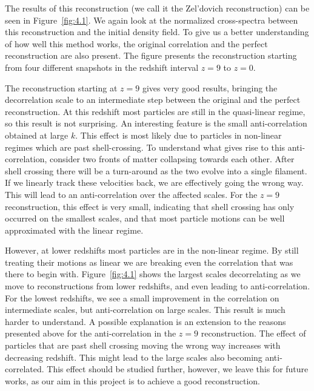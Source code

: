 The results of this reconstruction (we call it the Zel'dovich reconstruction) can be seen in Figure~\ref{fig:4.1}. We again look at the normalized cross-spectra between this reconstruction and the initial density field. To give us a better understanding of how well this method works, the original correlation and the perfect reconstruction are also present. The figure presents the reconstruction starting from four different snapshots in the redshift interval $z=9$ to $z=0$.

The reconstruction starting at $z=9$ gives very good results, bringing the decorrelation scale to an intermediate step between the original and the perfect reconstruction. At this redshift most particles are still in the quasi-linear regime, so this result is not surprising. An interesting feature is the small anti-correlation obtained at large $k$. This effect is most likely due to particles in non-linear regimes which are past shell-crossing. To understand what gives rise to this anti-correlation, consider two fronts of matter collapsing towards each other. After shell crossing there will be a turn-around as the two evolve into a single filament. If we linearly track these velocities back, we are effectively going the wrong way. This will lead to an anti-correlation over the affected scales. For the $z=9$ reconstruction, this effect is very small, indicating that shell crossing has only occurred on the smallest scales, and that most particle motions can be well approximated with the linear regime. 

However, at lower redshifts most particles are in the non-linear regime. By still treating their motions as linear we are breaking even the correlation that was there to begin with. Figure~\ref{fig:4.1} shows the largest scales decorrelating as we move to reconstructions from lower redshifts, and even leading to anti-correlation. For the lowest redshifts, we see a small improvement in the correlation on intermediate scales, but anti-correlation on large scales. This result is much harder to understand. A possible explanation is an extension to the reasons presented above for the anti-correlation in the $z=9$ reconstruction. The effect of particles that are past shell crossing moving the wrong way increases with decreasing redshift. This might lead to the large scales also becoming anti-correlated. This effect should be studied further, however, we leave this for future works, as our aim in this project is to achieve a good reconstruction.

